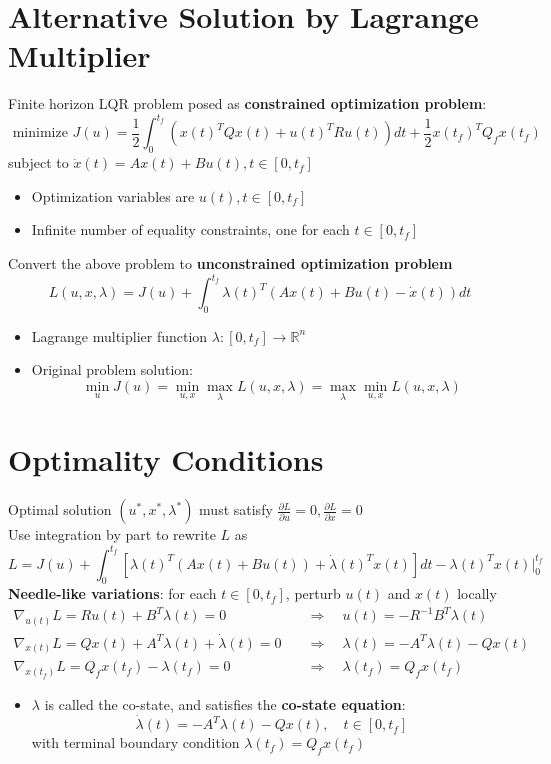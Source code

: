 \documentclass[10pt,a4paper,oneside]{article}
\begin{document}
\section{Alternative Solution by Lagrange Multiplier}
Finite horizon LQR problem posed as {\bfseries constrained optimization problem}:
$$
\text { minimize } J(u)=\frac{1}{2} \int_{0}^{t_{f}}\left(x(t)^{T} Q x(t)+u(t)^{T} R u(t)\right) d t+\frac{1}{2} x\left(t_{f}\right)^{T} Q_{f} x\left(t_{f}\right)
$$
subject to $\dot{x}(t)=Ax(t)+Bu(t),t\in[0,t_f]$
\begin{itemize}
\item Optimization variables are $u(t),t\in[0,t_f]$
\item Infinite number of equality constraints, one for each $t\in[0,t_f]$
\end{itemize}
Convert the above problem to {\bfseries unconstrained optimization problem}
$$
L(u, x, \lambda)=J(u)+\int_{0}^{t_{f}} \lambda(t)^{T}(A x(t)+B u(t)-\dot{x}(t)) d t
$$
\begin{itemize}
\item Lagrange multiplier function $\lambda:[0,t_f]\rightarrow\mathbb{R}^n$
\item Original problem solution:
$$
\min _{u} J(u)=\min _{u, x} \max _{\lambda} L(u, x, \lambda)=\max _{\lambda} \min _{u, x} L(u, x, \lambda)
$$
\end{itemize}
\section{Optimality Conditions}
Optimal solution $(u^*,x^*,\lambda^*)$ must satisfy $\frac{\partial L}{\partial u}=0, \frac{\partial L}{\partial x}=0$\\
Use integration by part to rewrite $L$ as
$$
L=J(u)+\int_{0}^{t_{f}}\left[\lambda(t)^{T}(A x(t)+B u(t))+\dot{\lambda}(t)^{T} x(t)\right] d t-\lambda(t)^{T} x\left.(t)\right|_{0} ^{t_{f}}
$$
{\bfseries Needle-like variations}: for each $t\in[0,t_f]$, perturb $u(t)$ and $x(t)$ locally
$$
\begin{aligned} \nabla_{u(t)} L=R u(t)+B^{T} \lambda(t)=0 &  \quad\Rightarrow \quad u(t)=-R^{-1} B^{T} \lambda(t) \\ \nabla_{x(t)} L=Q x(t)+A^{T} \lambda(t)+\dot{\lambda}(t)=0 &  \quad\Rightarrow \quad \lambda(t)=-A^{T} \lambda(t)-Q x(t) \\ \nabla_{x\left(t_{f}\right)} L=Q_{f} x\left(t_{f}\right)-\lambda\left(t_{f}\right)=0 &  \quad\Rightarrow \quad \lambda\left(t_{f}\right)=Q_{f} x\left(t_{f}\right) \end{aligned}
$$
\begin{itemize}
\item $\lambda$ is called the co-state, and satisfies the {\bfseries co-state equation}:
$$
\dot{\lambda}(t)=-A^{T} \lambda(t)-Q x(t), \quad t \in\left[0, t_{f}\right]
$$
with terminal boundary condition $\lambda(t_f)=Q_fx(t_f)$
\end{itemize}
\end{document}
